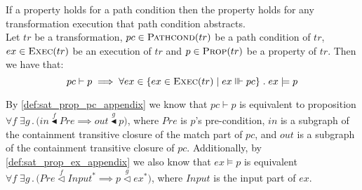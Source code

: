 \begin{lemma}{If a property holds for a path condition then the property holds for any transformation execution that path condition abstracts.\\}
\label{lemma:validity1_appendix}
Let $tr$ be a transformation, $pc\in \textsc{Pathcond}(tr)$ be a path condition of $tr$, $ex\in \textsc{Exec}(tr)$ be an execution of $tr$ and $p\in \textsc{Prop}(tr)$ be a property of $tr$. Then we have that:
\begin{equation}
\label{prop:validity1_appendix}
pc\vdash p \;\Longrightarrow \;\forall ex\in\{ex\in\textsc{Exec}(tr)\;|\;ex\Vvdash pc\}\;.\; ex\models p
\end{equation}
\end{lemma}
\begin{pf}
By \cref{def:sat_prop_pc_appendix} we know that $pc\vdash p$ is equivalent to proposition $\forall f\; \exists g\,.\,\big(in\stackrel{f}{\blacktriangleleft} Pre \implies out \stackrel{g}\blacktriangleleft p\big)$, where $Pre$ is $p$'s pre-condition, $in$ is a subgraph of the containment transitive closure of the match part of $pc$, and $out$ is a subgraph of the containment transitive closure of $pc$. Additionally, by \cref{def:sat_prop_ex_appendix} we also know that $ex\models p$ is equivalent $\forall f\; \exists g\,.\,\big(Pre \stackrel{f}{\vartriangleleft} Input^{*} \implies p \stackrel{g}{\vartriangleleft} ex^*\big)$, where $Input$ is the input part of $ex$.


\end{pf}
